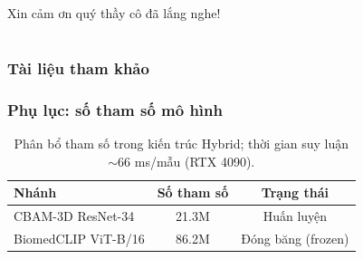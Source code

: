 \documentclass{beamer}
\numberwithin{figure}{section}
\numberwithin{table}{section}
\begin{document}
\begin{frame}
\huge{\centerline{Xin cảm ơn quý thầy cô đã lắng nghe!}}
\end{frame}

\section{}
\begin{frame}[allowframebreaks]
\frametitle{Tài liệu tham khảo}
\printbibliography
\end{frame}

\appendix
\begin{frame}
\frametitle{Phụ lục: số tham số mô hình}
\begin{table}
\centering
\begin{tabular}{lcc}
\toprule
\textbf{Nhánh} & \textbf{Số tham số} & \textbf{Trạng thái} \\
\midrule
CBAM-3D ResNet-34 & 21.3M & Huấn luyện \\
BiomedCLIP ViT-B/16 & 86.2M & Đóng băng (frozen) \\
\bottomrule
\end{tabular}
\caption{Phân bổ tham số trong kiến trúc Hybrid; thời gian suy luận $\sim$66 ms/mẫu (RTX 4090).}
\end{table}
\end{frame}
\end{document}
